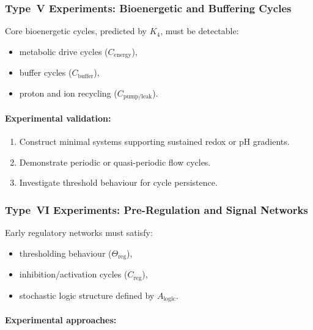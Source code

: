 \subsubsection{Type~V Experiments: Bioenergetic and Buffering Cycles}

Core bioenergetic cycles, predicted by $K_4$, must be detectable:

\begin{itemize}
    \item metabolic drive cycles ($C_{\mathrm{energy}}$),
    \item buffer cycles ($C_{\mathrm{buffer}}$),
    \item proton and ion recycling ($C_{\mathrm{pump/leak}}$).
\end{itemize}

\paragraph{Experimental validation:}

\begin{enumerate}
    \item Construct minimal systems supporting sustained redox or pH gradients.
    \item Demonstrate periodic or quasi-periodic flow cycles.
    \item Investigate threshold behaviour for cycle persistence.
\end{enumerate}



\subsubsection{Type~VI Experiments: Pre-Regulation and Signal Networks}

Early regulatory networks must satisfy:

\begin{itemize}
    \item thresholding behaviour ($\Theta_{\mathrm{reg}}$),
    \item inhibition/activation cycles ($C_{\mathrm{reg}}$),
    \item stochastic logic structure defined by $A_{\mathrm{logic}}$.
\end{itemize}

\paragraph{Experimental approaches:}

